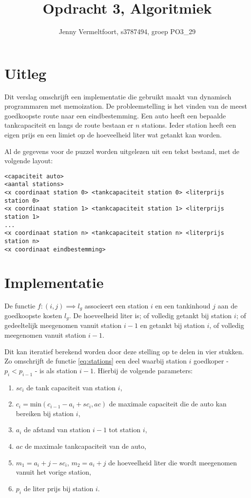 \documentclass[10pt,tikz]{article}
\title{Opdracht 3, Algoritmiek}
\author{Jenny Vermeltfoort, s3787494, groep PO3\_29}
\begin{document}
\def\tablename{Tabel}

\maketitle

\section*{Uitleg}
Dit verslag omschrijft een implementatie die gebruikt maakt van dynamisch programmaren met memoization.
De probleemstelling is het vinden van de meest goedkoopste route naar een eindbestemming.
Een auto heeft een bepaalde tankcapaciteit en langs de route bestaan er $n$ stations.
Ieder station heeft een eigen prijs en een limiet op de hoeveelheid liter wat getankt kan worden.

Al de gegevens voor de puzzel worden uitgelezen uit een tekst bestand, met de volgende layout:
\begin{lstlisting}
<capaciteit auto>
<aantal stations>
<x coordinaat station 0> <tankcapaciteit station 0> <literprijs station 0>
<x coordinaat station 1> <tankcapaciteit station 1> <literprijs station 1>
...
<x coordinaat station n> <tankcapaciteit station n> <literprijs station n>
<x coordinaat eindbestemming>
\end{lstlisting}


\section*{Implementatie}

De functie $f: (i,j) \implies l_g$ associeert een station $i$ en een tankinhoud $j$ aan de goedkoopste kosten $l_g$.
De hoeveelheid liter is; of volledig getankt bij station $i$; of gedeeltelijk meegenomen vanuit station $i-1$ en getankt bij station $i$, of volledig meegenomen vanuit station $i-1$.

Dit kan iteratief berekend worden door deze stelling op te delen in vier stukken.
Zo omschrijft de functie \ref{eq:stations} een deel waarbij station $i$ goedkoper - $p_i < p_{i-1}$ - is als station $i-1$.
Hierbij de volgende parameters:
\begin{enumerate}[label=\roman*.]
	\item $sc_i$ de tank capaciteit van station $i$,
	\item $c_i = \text{min}(c_{i-1} - a_i + sc_i, ac)$ de maximale capaciteit die de auto kan bereiken bij station $i$,
	\item $a_i$ de afstand van station $i-1$ tot station $i$,
	\item $ac$ de maximale tankcapaciteit van de auto,
	\item $m_1 = a_i + j - sc_i$, $m_2 = a_i + j$ de hoeveelheid liter die wordt meegenomen vanuit het vorige station,
	\item $p_i$ de liter prijs bij station $i$.
\end{enumerate}
\end{document}
